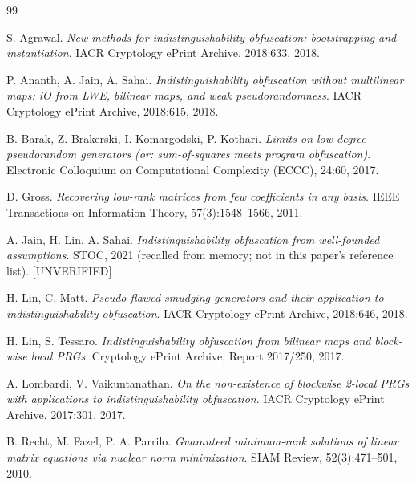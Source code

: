\documentclass{aicr-conjecture}
\begin{document}
\begin{aicrbibliography}{99}

S. Agrawal.
\emph{New methods for indistinguishability obfuscation: bootstrapping
and instantiation}.
IACR Cryptology ePrint Archive, 2018:633, 2018.

P. Ananth, A. Jain, A. Sahai.
\emph{Indistinguishability obfuscation without multilinear maps: iO
from LWE, bilinear maps, and weak pseudorandomness}.
IACR Cryptology ePrint Archive, 2018:615, 2018.

B. Barak, Z. Brakerski, I. Komargodski, P. Kothari.
\emph{Limits on low-degree pseudorandom generators (or: sum-of-squares
meets program obfuscation)}.
Electronic Colloquium on Computational Complexity (ECCC), 24:60, 2017.

D. Gross.
\emph{Recovering low-rank matrices from few coefficients in any basis}.
IEEE Transactions on Information Theory, 57(3):1548--1566, 2011.

A. Jain, H. Lin, A. Sahai.
\emph{Indistinguishability obfuscation from well-founded assumptions}.
STOC, 2021 (recalled from memory; not in this paper's reference list).
[UNVERIFIED]

H. Lin, C. Matt.
\emph{Pseudo flawed-smudging generators and their application to
indistinguishability obfuscation}.
IACR Cryptology ePrint Archive, 2018:646, 2018.

H. Lin, S. Tessaro.
\emph{Indistinguishability obfuscation from bilinear maps and
block-wise local PRGs}.
Cryptology ePrint Archive, Report 2017/250, 2017.

A. Lombardi, V. Vaikuntanathan.
\emph{On the non-existence of blockwise 2-local PRGs with applications
to indistinguishability obfuscation}.
IACR Cryptology ePrint Archive, 2017:301, 2017.

B. Recht, M. Fazel, P. A. Parrilo.
\emph{Guaranteed minimum-rank solutions of linear matrix equations via
nuclear norm minimization}.
SIAM Review, 52(3):471--501, 2010.

\end{aicrbibliography}
\end{document}
